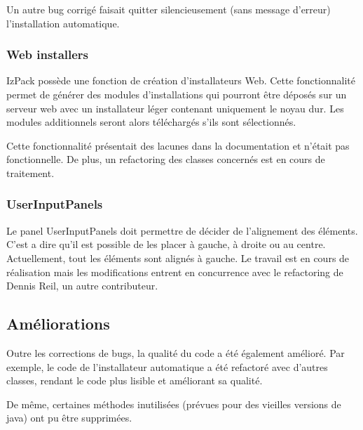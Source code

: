 Un autre bug corrigé faisait quitter silencieusement (sans message d'erreur) l'installation automatique.
\subsubsection{Web installers}
IzPack possède une fonction de création d'installateurs Web.
Cette fonctionnalité permet de générer des modules d'installations qui pourront être déposés sur un serveur web avec un installateur léger contenant uniquement le noyau dur.
Les modules additionnels seront alors téléchargés s'ils sont sélectionnés.

Cette fonctionnalité présentait des lacunes dans la documentation et n'était pas fonctionnelle.
De plus, un refactoring des classes concernés est en cours de traitement.
\subsubsection{UserInputPanels}
Le panel UserInputPanels doit permettre de décider de l'alignement des éléments.
C'est a dire qu'il est possible de les placer à gauche, à droite ou au centre. Actuellement, tout les éléments sont alignés à gauche.
Le travail est en cours de réalisation mais les modifications entrent en concurrence avec le refactoring de Dennis Reil, un autre contributeur.

\subsection{Améliorations}
Outre les corrections de bugs, la qualité du code a été également amélioré.
Par exemple, le code de l'installateur automatique a été refactoré avec d'autres classes, rendant le code plus lisible et améliorant sa qualité.

De même, certaines méthodes inutilisées (prévues pour des vieilles versions de java) ont pu être supprimées.